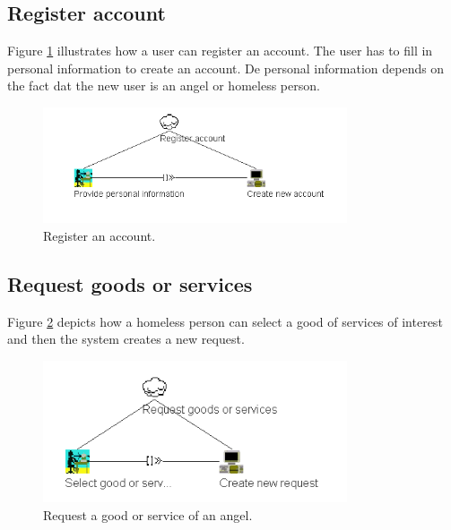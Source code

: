 \documentclass[a4paper]{report}
\begin{document}
\subsection{Register account}
Figure \ref{fig:CTTRegister} illustrates how a user can register an account. The user has to fill in personal information to create an account. De personal information depends on the fact dat the new user is an angel or homeless person.
\begin{figure}[h]
    \centering
    \includegraphics[width=0.8\textwidth]{CTT/CTTpng/CTTRegister.png}
    \caption{Register an account.}
    \label{fig:CTTRegister}
\end{figure}

\subsection{Request goods or services}
Figure \ref{fig:CTTRequestGoods} depicts how a homeless person can select a good of services of interest and then the system creates a new request.
\begin{figure}[h]
    \centering
    \includegraphics[width=0.8\textwidth]{CTT/CTTpng/CTTRequestGoods.png}
    \caption{Request a good or service of an angel.}
    \label{fig:CTTRequestGoods}
\end{figure}
\end{document}
